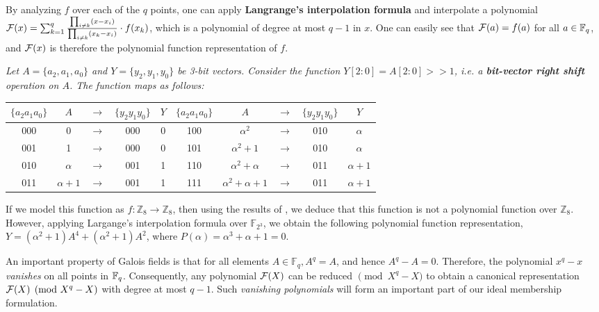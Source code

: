 By analyzing $f$ over each of the $q$ points, one can apply
{\bf Langrange's interpolation formula} and interpolate a polynomial
${\mathcal{F}}(x) = \sum_{k=1} ^q  \frac{ \prod_{i \neq k}  (x -x_i)}{\prod_{i \neq k}
  (x_k -x_i)} \cdot f(x_k)$, which is a polynomial of degree at 
most $q-1$ in $x$. One can easily see that ${\mathcal{F}}(a)=f(a)$ for all $a \in
{\mathbb{F}}_{q}$, and ${\mathcal{F}}(x)$ is therefore the polynomial function representation
of $f$. 

\begin{Example} {\it
Let $A = \{a_2, a_1, a_0\}$ and $Y = \{y_2, y_1,
y_0\}$ be 3-bit vectors.  Consider the function $Y[2:0] = A[2:0]
>> 1$, i.e. a {\bf bit-vector right shift} operation on $A$. 
The function maps as follows:

\begin{center}
{\small
\begin{tabular}{c|ccc|c||c|ccc|c}
$\{a_2a_1a_0\}$  & $A$ &$\rightarrow$& $\{y_2y_1y_0\}$ &$Y$ &
  $\{a_2a_1a_0\}$  &$A$&$\rightarrow$& $\{y_2y_1y_0\}$ &$Y$\\
\hline
000  &0 &$\rightarrow$& 000 & 0 & 100  &$\alpha^2$ &$\rightarrow$& 010 &  $\alpha$ \\
001  &1 &$\rightarrow$& 000 & 0 & 101  &$\alpha^2 + 1$ &$\rightarrow$&010 & $\alpha$ \\
010  &$\alpha$ & $\rightarrow$ & 001& 1 & 110  &$\alpha^2 + \alpha$&$\rightarrow$& 011 &$\alpha + 1$ \\   
011  &$\alpha + 1$ &$\rightarrow$& 001 &1 & 111& $\alpha^2 + \alpha + 1$ &$\rightarrow$& 011 &$\alpha + 1$\\
\hline
\end {tabular}
}
\end{center}

If we model this function as $f: {\mathbb{Z}}_{8} \rightarrow
{\mathbb{Z}}_{8}$, then using the results of \cite{singmaster}
\cite{chen_95} \cite{chen_96}, we deduce that this function is not a
polynomial function over ${\mathbb{Z}}_{8}$. However, applying
Largange's interpolation formula over ${\mathbb{F}}_{2^3}$, we obtain
the following polynomial function representation, $Y =
(\alpha^2+1)A^4+(\alpha^2+1)A^2$, where $P(\alpha) = \alpha^3 +
\alpha + 1 = 0$. 
}
\end{Example}

An important property of Galois fields is that for all elements $A \in
{\mathbb{F}}_q, A^q = A$, and hence $A^q - A =  0.$ Therefore, the
polynomial $x^q -x$ {\it vanishes} on all points in
${\mathbb{F}}_{q}$. Consequently, any polynomial ${\mathcal{F}}(X)$ can be reduced $\pmod{ X^q
  - X}$ to obtain a canonical representation ${\mathcal{F}}(X) \pmod{X^q - X}$
with degree at most $q-1$. Such {\it vanishing polynomials} will form
an important part of our ideal membership formulation.  


